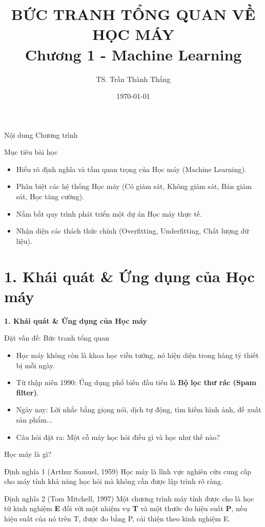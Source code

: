 \documentclass[aspectratio=169]{beamer}
\title[Chương 1: Tổng quan Học máy]{BỨC TRANH TỔNG QUAN VỀ HỌC MÁY \\ \vspace{0.5cm} \Large Chương 1 - Machine Learning}
\author{TS. Trần Thành Thắng}
\institute{Đại học Đông Á}
\date{\today}
\begin{document}
\begin{frame}
\titlepage
\end{frame}

\begin{frame}{Nội dung Chương trình}
\tableofcontents[hideallsubsections]
\end{frame}

\begin{frame}{Mục tiêu bài học}
\begin{itemize}
    \item Hiểu rõ định nghĩa và tầm quan trọng của Học máy (Machine Learning).
    \item Phân biệt các hệ thống Học máy (Có giám sát, Không giám sát, Bán giám sát, Học tăng cường).
    \item Nắm bắt quy trình phát triển một dự án Học máy thực tế.
    \item Nhận diện các thách thức chính (Overfitting, Underfitting, Chất lượng dữ liệu).
\end{itemize}
\end{frame}

\section{1. Khái quát \& Ứng dụng của Học máy}

\begin{frame}
\vfill\centering\LARGE\textbf{1. Khái quát \& Ứng dụng của Học máy}\vfill
\end{frame}

\begin{frame}{Đặt vấn đề: Bức tranh tổng quan}
\begin{itemize}
    \item Học máy không còn là khoa học viễn tưởng, nó hiện diện trong hàng tỷ thiết bị mỗi ngày.
    \item Từ thập niên 1990: Ứng dụng phổ biến đầu tiên là \textbf{Bộ lọc thư rác (Spam filter)}.
    \item Ngày nay: Lời nhắc bằng giọng nói, dịch tự động, tìm kiếm hình ảnh, đề xuất sản phẩm...
    \item Câu hỏi đặt ra: Một cỗ máy học hỏi điều gì và học như thế nào?
\end{itemize}
\end{frame}

\begin{frame}{Học máy là gì?}
\begin{block}{Định nghĩa 1 (Arthur Samuel, 1959)}
Học máy là lĩnh vực nghiên cứu cung cấp cho máy tính khả năng học hỏi mà không cần được lập trình rõ ràng.
\end{block}
\begin{block}{Định nghĩa 2 (Tom Mitchell, 1997)}
Một chương trình máy tính được cho là học từ kinh nghiệm \textbf{E} đối với một nhiệm vụ \textbf{T} và một thước đo hiệu suất \textbf{P}, nếu hiệu suất của nó trên T, được đo bằng P, cải thiện theo kinh nghiệm E.
\end{block}
\end{frame}
\end{document}
